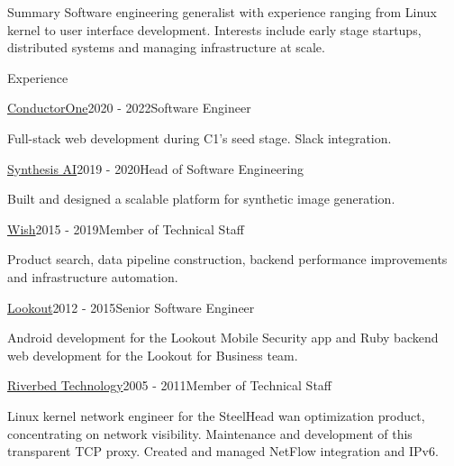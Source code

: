 \documentclass{resume} %
\begin{document}
\begin{rSection}{Summary}
Software engineering generalist with experience ranging from Linux kernel to user interface development. Interests include
early stage startups, distributed systems and managing infrastructure at scale.
\end{rSection}

\begin{rSection}{Experience}

\begin{rSubsection}{\href{https://conductorone.com}{ConductorOne}}{2020 - 2022}{Software Engineer}{}
\item Full-stack web development during C1's seed stage. Slack integration.
\end{rSubsection}

\begin{rSubsection}{\href{https://synthesis.ai}{Synthesis AI}}{2019 - 2020}{Head of Software Engineering}{}
\item Built and designed a scalable platform for synthetic image generation.
\end{rSubsection}

\begin{rSubsection}{\href{https://wish.com}{Wish}}{2015 - 2019}{Member of Technical Staff}{}
\item Product search, data pipeline construction, backend performance improvements and infrastructure automation.
\end{rSubsection}

\begin{rSubsection}{\href{https://lookout.com}{Lookout}}{2012 - 2015}{Senior Software Engineer}{}
\item Android development for the Lookout Mobile Security app and Ruby backend web development for the Lookout for Business team.
\end{rSubsection}

\begin{rSubsection}{\href{https://riverbed.com}{Riverbed Technology}}{2005 - 2011}{Member of Technical Staff}{}
\item Linux kernel network engineer for the SteelHead wan optimization product, concentrating on network visibility.
Maintenance and development of this transparent TCP proxy. Created and managed NetFlow integration and IPv6.
\end{rSubsection}

\end{rSection}
\end{document}
